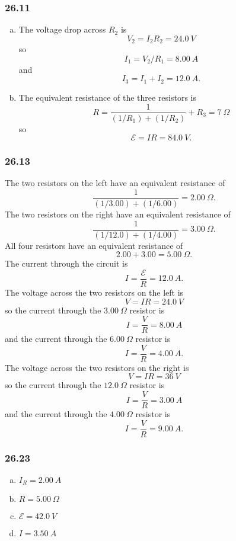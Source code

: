 \documentclass{article}
\begin{document}
\subsubsection{26.11}

\begin{enumerate}[(a)]
  \item The voltage drop across $R_2$ is \[V_2 = I_2 R_2 = \qty{24.0}{V}\] so \[I_1 = V_2 / R_1 = \qty{8.00}{A}\] and \[I_3 = I_1 + I_2 = \qty{12.0}{A}.\]

  \item The equivalent resistance of the three resistors is \[R = \frac{1}{(1 / R_1) + (1 / R_2)} + R_3 = \qty{7}{\Omega}\] so \[\mathcal{E} = I R = \qty{84.0}{V}.\]
\end{enumerate}

\subsubsection{26.13}

The two resistors on the left have an equivalent resistance of \[\frac{1}{(1 / 3.00) + (1 / 6.00)} = \qty{2.00}{\Omega}.\] The two resistors on the right have an equivalent resistance of \[\frac{1}{(1 / 12.0) + (1 / 4.00)} = \qty{3.00}{\Omega}.\] All four resistors have an equivalent resistance of \[2.00 + 3.00 = \qty{5.00}{\Omega}.\] The current through the circuit is \[I = \frac{\mathcal{E}}{R} = \qty{12.0}{A}.\] The voltage across the two resistors on the left is \[V = I R = \qty{24.0}{V}\] so the current through  the $\qty{3.00}{\Omega}$ resistor is \[I = \frac{V}{R} = \qty{8.00}{A}\] and the current through the $\qty{6.00}{\Omega}$ resistor is \[I = \frac{V}{R} = \qty{4.00}{A}.\] The voltage across the two resistors on the right is \[V = I R = \qty{36}{V}\] so the current through the $\qty{12.0}{\Omega}$ resistor is \[I = \frac{V}{R} = \qty{3.00}{A}\] and the current through the $\qty{4.00}{\Omega}$ resistor is \[I = \frac{V}{R} = \qty{9.00}{A}.\]

\subsubsection{26.23}

\begin{enumerate}[(a)]
  \item $I_R = \qty{2.00}{A}$

  \item $R = \qty{5.00}{\Omega}$

  \item $\mathcal{E} = \qty{42.0}{V}$

  \item $I = \qty{3.50}{A}$
\end{enumerate}
\end{document}
